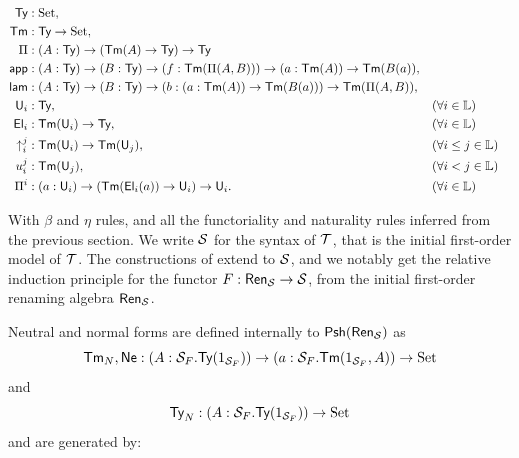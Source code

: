 \documentclass{article}
\begin{document}
\begin{align*}
    \textsf{Ty} &: \text{Set},\\
    \textsf{Tm} &: \textsf{Ty} \rightarrow \text{Set},\\
    \Pi &: (A:\textsf{Ty}) \rightarrow (\textsf{Tm}(A) \rightarrow \textsf{Ty}) \rightarrow \textsf{Ty}\\
    \textsf{app} &: (A:\textsf{Ty}) \rightarrow (B:\textsf{Ty}) \rightarrow (f:\textsf{Tm}(\Pi(A,B))) \rightarrow (a:\textsf{Tm}(A)) \rightarrow \textsf{Tm}(B(a)),\\
    \textsf{lam} &: (A:\textsf{Ty}) \rightarrow (B:\textsf{Ty}) \rightarrow (b: (a:\textsf{Tm}(A)) \rightarrow \textsf{Tm}(B(a))) \rightarrow \textsf{Tm}(\Pi(A,B)),\\
    \textsf{U}_i &: \textsf{Ty}, && (\forall i \in \mathbb{L})\\
    \textsf{El}_i &: \textsf{Tm}(\textsf{U}_i) \rightarrow \textsf{Ty}, && (\forall i \in \mathbb{L})\\
    \uparrow_i^j &: \textsf{Tm}(\textsf{U}_i) \rightarrow \textsf{Tm}(\textsf{U}_j), && (\forall i \leq j \in \mathbb{L})\\
    u_i^j &: \textsf{Tm}(\textsf{U}_j), && (\forall i < j \in \mathbb{L})\\
    \Pi^i &: (a:\textsf{U}_i) \rightarrow (\textsf{Tm}(\textsf{El}_i(a)) \rightarrow \textsf{U}_i) \rightarrow \textsf{U}_i. && (\forall i \in \mathbb{L})
\end{align*}

With $\beta$ and $\eta$ rules, and all the functoriality and naturality rules inferred from the previous section.
We write $\mathcal{S}$ for the syntax of $\mathcal{T}$, that is the initial first-order model of $\mathcal{T}$. The constructions of \cite{sconing} extend
to $\mathcal{S}$, and we notably get the relative induction principle for the functor $F : \mathsf{Ren}_{\mathcal{S}} \rightarrow \mathcal{S}$, from the initial first-order
renaming algebra $\mathsf{Ren}_{\mathcal{S}}$.


Neutral and normal forms are defined internally to $\textsf{Psh}(\mathsf{Ren}_{\mathcal{S}})$ as 
\[\textsf{Tm}_N, \textsf{Ne} : (A: \mathcal{S}_F.\textsf{Ty}(1_{\mathcal{S}_F})) \rightarrow (a: \mathcal{S}_F.\textsf{Tm}(1_{\mathcal{S}_F},A)) \rightarrow \text{Set}\]
and
\[\textsf{Ty}_N : (A: \mathcal{S}_F.\textsf{Ty}(1_{\mathcal{S}_F})) \rightarrow \text{Set}\]
and are generated by:
\end{document}
